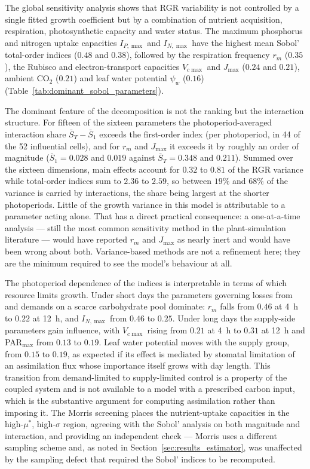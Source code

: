 \documentclass[a4paper,fleqn]{cas-sc}
\begin{document}
The global sensitivity analysis shows that RGR variability is not controlled
by a single fitted growth coefficient but by a combination of nutrient
acquisition, respiration, photosynthetic capacity and water status. The
maximum phosphorus and nitrogen uptake capacities $I_{P,\max}$ and
$I_{N,\max}$ have the highest mean Sobol' total-order indices ($0.48$ and
$0.38$), followed by the respiration frequency $r_m$ ($0.35$), the Rubisco and
electron-transport capacities $V_{c\max}$ and $J_{\max}$ ($0.24$ and $0.21$),
ambient CO$_2$ ($0.21$) and leaf water potential $\psi_w$ ($0.16$)
(Table~\ref{tab:dominant_sobol_parameters}).

The dominant feature of the decomposition is not the ranking but the
interaction structure. For fifteen of the sixteen parameters the
photoperiod-averaged interaction share $\bar S_T - \bar S_1$ exceeds the
first-order index (per photoperiod, in 44 of the 52 influential cells), and for
$r_m$ and $J_{\max}$ it exceeds it by roughly an order of magnitude
($\bar S_1 = 0.028$ and $0.019$ against $\bar S_T = 0.348$ and $0.211$).
Summed over the sixteen dimensions, main effects account for $0.32$ to $0.81$
of the RGR variance while total-order indices sum to $2.36$ to $2.59$, so
between $19\%$ and $68\%$ of the variance is carried by interactions, the share
being largest at the shorter photoperiods. Little
of the growth variance in this model is attributable to a parameter acting
alone. That has a
direct practical consequence: a one-at-a-time analysis --- still the most
common sensitivity method in the plant-simulation literature --- would have
reported $r_m$ and $J_{\max}$ as nearly inert and would have been wrong
about both. Variance-based methods are not a refinement here; they are the
minimum required to see the model's behaviour at all.

The photoperiod dependence of the indices is interpretable in terms of which
resource limits growth. Under short days the parameters governing losses from
and demands on a scarce carbohydrate pool dominate: $r_m$ falls from $0.46$ at
4~h to $0.22$ at 12~h, and $I_{N,\max}$ from $0.46$ to $0.25$. Under long
days the supply-side parameters gain influence, with $V_{c\max}$ rising from
$0.21$ at 4~h to $0.31$ at 12~h and PAR$_{\max}$ from $0.13$ to $0.19$. Leaf
water potential moves with the supply group, from $0.15$ to $0.19$, as
expected if its effect is mediated by stomatal limitation of an assimilation
flux whose importance itself grows with day length. This transition from
demand-limited to supply-limited control is a property of the coupled system
and is not available to a model with a prescribed carbon input, which is the
substantive argument for computing assimilation rather than imposing it. The
Morris screening places the nutrient-uptake capacities in the
high-$\mu^\ast$, high-$\sigma$ region, agreeing with the Sobol' analysis on
both magnitude and interaction, and providing an independent check --- Morris
uses a different sampling scheme and, as noted in
Section~\ref{sec:results_estimator}, was unaffected by the sampling defect
that required the Sobol' indices to be recomputed.
\end{document}
